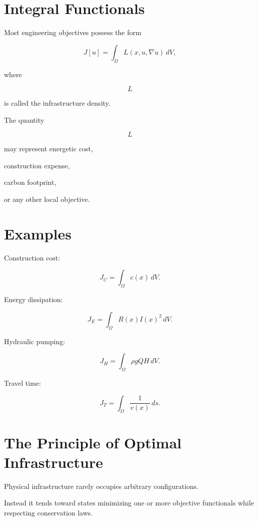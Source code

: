 \documentclass[11pt,fleqn]{book}
\numberwithin{equation}{chapter}
\theoremstyle{plain}
\theoremstyle{definition}
\theoremstyle{remark}
\begin{document}

\section{Integral Functionals}

Most engineering objectives possess the form

\[
\boxed{
J[u]
=
\int_\Omega
L(x,u,\nabla u)\,dV,
}
\]

where

\[
L
\]

is called the infrastructure density.

The quantity

\[
L
\]

may represent energetic cost,

construction expense,

carbon footprint,

or any other local objective.


\section{Examples}

Construction cost:

\[
J_C
=
\int_\Omega
c(x)\,dV.
\]

Energy dissipation:

\[
J_E
=
\int_\Omega
R(x)
I(x)^2\,dV.
\]

Hydraulic pumping:

\[
J_H
=
\int_\Omega
\rho gQH\,dV.
\]

Travel time:

\[
J_T
=
\int_\Omega
\frac1{v(x)}\,ds.
\]


\section{The Principle of Optimal Infrastructure}

Physical infrastructure rarely occupies arbitrary configurations.

Instead it tends toward states minimizing one or more objective
functionals while respecting conservation laws.

\end{document}
